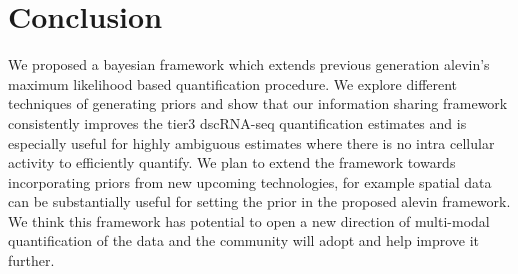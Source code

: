 \section{Conclusion}
We proposed a bayesian framework which extends previous generation alevin's maximum likelihood based 
quantification procedure. We explore different techniques of generating priors and show that our 
information sharing framework consistently improves the tier3 dscRNA-seq quantification estimates and 
is especially useful for highly ambiguous estimates where there is no intra cellular activity to 
efficiently quantify. We plan to extend the framework towards incorporating priors from new upcoming 
technologies, for example spatial data can be substantially useful for setting the prior in the proposed 
alevin framework.  We think this framework has potential to open a new direction of multi-modal 
quantification of the data and the community will adopt and help improve it further.
